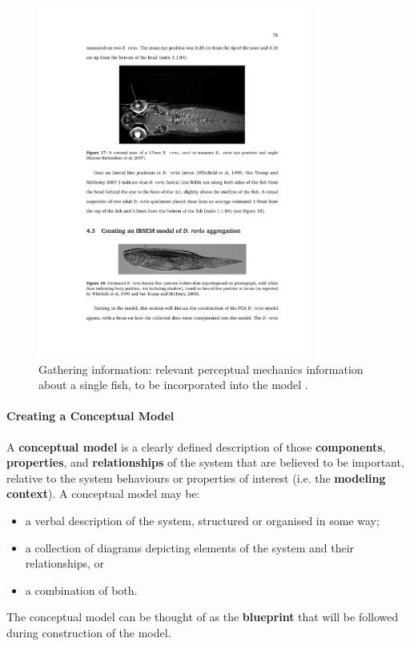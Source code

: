 \begin{figure}[!t]
	\centering
		\includegraphics[width=0.80\textwidth]{images/SIM/information_about_system2.pdf}
	\caption[\small Some information about fish perceptual mechanics]{\small Gathering information: relevant perceptual mechanics information about a single fish, to be incorporated into the model \cite{SIM_S}.}
	\label{simfig:5}
\end{figure}
\afterpage{\FloatBarrier}
\paragraph{Creating a Conceptual Model}

A \textbf{conceptual model} is a clearly defined description of those \textbf{components}, \textbf{properties}, and \textbf{relationships} of the system that are believed to be important, relative to the system behaviours or properties of interest (i.e. the \textbf{modeling context}). A conceptual model may be: 
\begin{itemize}[noitemsep]
\item a verbal description of the system, structured or organised in some way;
\item a collection of diagrams depicting elements of the system and their relationships, or 
\item a combination of both.
\end{itemize}
The conceptual model can be thought of as the \textbf{blueprint} that will be followed during construction of the model.

